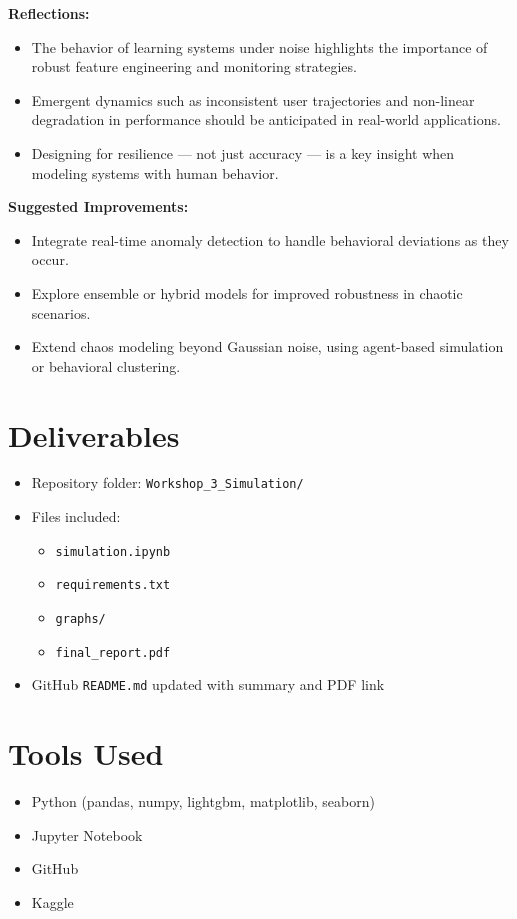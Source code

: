 \documentclass[12pt]{article}
\begin{document}
\textbf{Reflections:}
\begin{itemize}
	\item The behavior of learning systems under noise highlights the importance of robust feature engineering and monitoring strategies.
	\item Emergent dynamics such as inconsistent user trajectories and non-linear degradation in performance should be anticipated in real-world applications.
	\item Designing for resilience — not just accuracy — is a key insight when modeling systems with human behavior.
\end{itemize}

\textbf{Suggested Improvements:}
\begin{itemize}
	\item Integrate real-time anomaly detection to handle behavioral deviations as they occur.
	\item Explore ensemble or hybrid models for improved robustness in chaotic scenarios.
	\item Extend chaos modeling beyond Gaussian noise, using agent-based simulation or behavioral clustering.
\end{itemize}
	
	\section{Deliverables}
	\begin{itemize}
		\item Repository folder: \texttt{Workshop\_3\_Simulation/}
		\item Files included:
		\begin{itemize}
			\item \texttt{simulation.ipynb}
			\item \texttt{requirements.txt}
			\item \texttt{graphs/}
			\item \texttt{final\_report.pdf}
		\end{itemize}
		\item GitHub \texttt{README.md} updated with summary and PDF link
	\end{itemize}
	
	\section*{Tools Used}
	\begin{itemize}
		\item Python (pandas, numpy, lightgbm, matplotlib, seaborn)
		\item Jupyter Notebook
		\item GitHub
		\item Kaggle
	\end{itemize}
	
\end{document}
